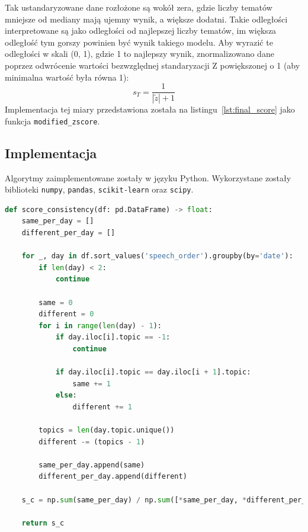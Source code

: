 		Tak ustandaryzowane dane rozłożone są wokół zera, gdzie liczby tematów mniejsze od mediany mają ujemny wynik, a większe dodatni.
		Takie odległości interpretowane są jako odległości od najlepszej liczby tematów,
			im większa odległość tym gorszy powinien być wynik takiego modelu.
		Aby wyrazić te odległości w skali (0, 1), gdzie 1 to najlepszy wynik, znormalizowano dane
			poprzez odwrócenie wartości bezwzględnej standaryzacji Z powiększonej o 1 (aby minimalna wartość była równa 1):
		\[s_T=\frac{1}{|\tilde{z}|+1}\]
		Implementacja tej miary przedstawiona została na listingu~\ref{lst:final_score} jako funkcja \verb|modified_zscore|.

	\subsection{Implementacja}
		Algorytmy zaimplementowane zostały w języku Python.
		Wykorzystane zostały biblioteki \verb|numpy|, \verb|pandas|, \verb|scikit-learn| oraz \verb|scipy|.

	\begin{lstlisting}[label=lst:score_consistency,language=Python,caption=Funkcja obliczająca spójność s\_c]
def score_consistency(df: pd.DataFrame) -> float:
	same_per_day = []
	different_per_day = []

	for _, day in df.sort_values('speech_order').groupby(by='date'):
		if len(day) < 2:
			continue

		same = 0
		different = 0
		for i in range(len(day) - 1):
			if day.iloc[i].topic == -1:
				continue

			if day.iloc[i].topic == day.iloc[i + 1].topic:
				same += 1
			else:
				different += 1

		topics = len(day.topic.unique())
		different -= (topics - 1)

		same_per_day.append(same)
		different_per_day.append(different)

	s_c = np.sum(same_per_day) / np.sum([*same_per_day, *different_per_day])

	return s_c
		\end{lstlisting}

